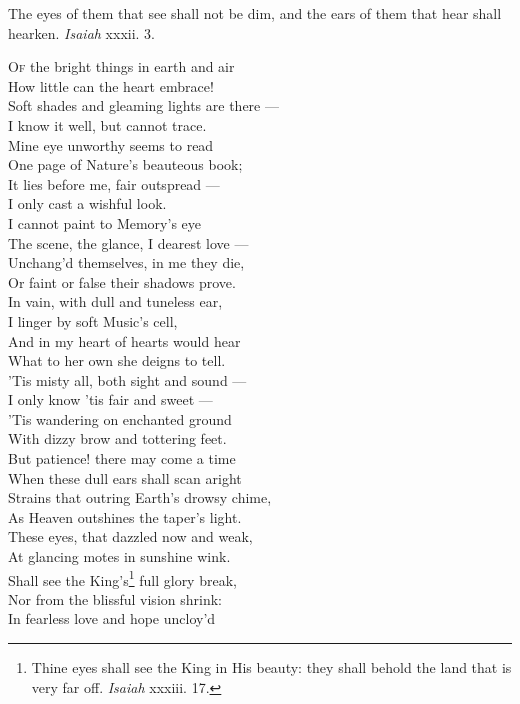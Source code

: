 The eyes of them that see shall not be dim, and the ears of them that hear shall hearken. \emph{Isaiah} xxxii. 3.

\textsc{Of} the bright things in earth and air \\
 How little can the heart embrace! \\
 Soft shades and gleaming lights are there — \\
 I know it well, but cannot trace. \\
  Mine eye unworthy seems to read \\
 One page of Nature’s beauteous book; \\
 It lies before me, fair outspread — \\
 I only cast a wishful look. \\
  I cannot paint to Memory’s eye \\
 The scene, the glance, I dearest love — \\
 Unchang’d themselves, in me they die, \\
 Or faint or false their shadows prove. \\
  In vain, with dull and tuneless ear, \\
 I linger by soft Music’s cell, \\
 And in my heart of hearts would hear \\
 What to her own she deigns to tell. \\
  ’Tis misty all, both sight and sound — \\
 I only know ’tis fair and sweet — \\
 ’Tis wandering on enchanted ground \\
 With dizzy brow and tottering feet. \\
  But patience! there may come a time \\
 When these dull ears shall scan aright \\
 Strains that outring Earth’s drowsy chime, \\
 As Heaven outshines the taper’s light. \\
  These eyes, that dazzled now and weak, \\
 At glancing motes in sunshine wink. \\
 Shall see the King’s\footnote{Thine eyes shall see the King in His beauty: they shall behold the land that is very far off. \emph{Isaiah} xxxiii. 17.} full glory break, \\
 Nor from the blissful vision shrink: \\
  In fearless love and hope uncloy’d \\
